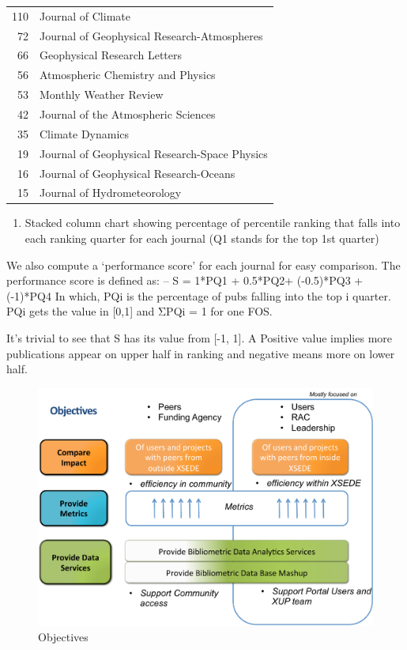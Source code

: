 \documentclass{sig-alternate}
\begin{document}
\begin{table}[h]
\begin{tiny}
\begin{tabular}{rl}
110	&  Journal of Climate \\
72	&  Journal of Geophysical Research-Atmospheres \\
66	&  Geophysical Research Letters \\
56	&  Atmospheric Chemistry and Physics \\
53	&  Monthly Weather Review \\
42	&  Journal of the Atmospheric Sciences \\
35	&  Climate Dynamics \\
19	&  Journal of Geophysical Research-Space Physics \\
16	&  Journal of Geophysical Research-Oceans \\
15	&  Journal of Hydrometeorology \\
\end{tabular}
\end{tiny}
\end{table}

\begin{enumerate}
\item	Stacked column chart showing percentage of percentile ranking that falls into each ranking quarter for each journal (Q1 stands for the top 1st quarter)
\end{enumerate}

We also compute a ‘performance score’ for each journal for easy comparison. The performance score is defined as:
–	S = 1*PQ1 + 0.5*PQ2+ (-0.5)*PQ3 + (-1)*PQ4
In which, PQi is the percentage of pubs falling into the top i quarter. PQi gets the value in [0,1] and ΣPQi = 1 for one FOS.

It’s trivial to see that S has its value from [-1, 1]. A Positive value implies more publications appear on upper half in ranking and negative means more on lower half.



\begin{figure}[htb] 
  \centering 
    \includegraphics[width=1.0\columnwidth]{images-new/objectives.pdf} 
  \caption{Objectives}\label{F:objectives} 
\end{figure} 
 
\end{document}
